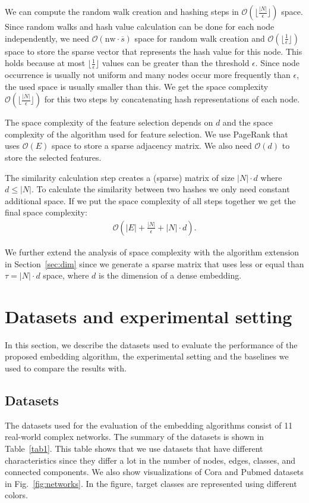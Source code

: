 \documentclass[twoside,11pt]{article}
\begin{document}
We can compute the random walk creation and hashing steps in $\mathcal{O}(\lfloor\frac{|N|}{\epsilon}\rfloor)$ space. Since random walks and hash value calculation can be done for each node independently, we need $\mathcal{O}(\textrm{nw}\cdot\overline{s})$ space for random walk creation and $\mathcal{O}( \lfloor \frac{1}{\epsilon} \rfloor)$ space to store the sparse vector that represents the hash value for this node. This holds because at most $\lfloor \frac{1}{\epsilon} \rfloor$ values can be greater than the threshold $\epsilon$. Since node occurrence is usually not uniform and many nodes occur more frequently than $\epsilon$, the used space is usually smaller than this. We get the space complexity $\mathcal{O}( \lfloor\frac{|N|}{ \epsilon}\rfloor)$ for this two steps by concatenating hash representations of each node. 

The space complexity of the feature selection depends on $d$ and the space complexity of the algorithm used for feature selection. We use PageRank that uses $\mathcal{O}(E)$ space to store a sparse adjacency matrix. We also need $\mathcal{O}(d)$ to store the selected features.

The similarity calculation step creates a (sparse) matrix of size $|N|\cdot d$ where $d \leq |N|$. To calculate the similarity between two hashes we only need constant additional space. If we put the space complexity of all steps together we get the final space complexity:
\begin{align*}
\mathcal{O}(|E| + \frac{|N|}{\epsilon} + |N|\cdot d).
\end{align*}

We further extend the analysis of space complexity with the algorithm extension in Section~\ref{sec:dim} since we generate a sparse matrix that uses less or equal than $\tau = |N|\cdot d$ space, where $d$ is the dimension of a dense embedding.

\section{Datasets and experimental setting}
In this section, we describe the datasets used to evaluate the performance of the proposed embedding algorithm, the experimental setting and the baselines we used to compare the results with.

\subsection{Datasets}
The datasets used for the evaluation of the embedding algorithms consist of 11 real-world complex networks. The summary of the datasets is shown in Table~\ref{tab1}. This table shows that we use datasets that have different characteristics since they differ a lot in the number of nodes, edges, classes, and connected components. We also show visualizations of Cora and Pubmed datasets in Fig.~\ref{fig:networks}. In the figure, target classes are represented using different colors.
\end{document}
